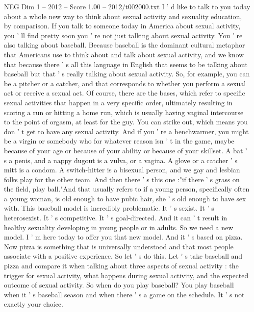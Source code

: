\begin{textsample}{NEG Dim 1 – 2012 – Score 1.00 – 2012/t002000.txt}  \label{ex:f1_neg_045}
I ' d like to talk to you today about a whole new way to think about sexual activity and sexuality education, by comparison.
If you talk to someone today in America about sexual activity, you ' ll find pretty soon you ' re not just talking about sexual activity.
You ' re also talking about baseball.
Because baseball is the dominant cultural metaphor that Americans use to think about and talk about sexual activity, and we know that because there ' s all this language in English that seems to be talking about baseball but that ' s really talking about sexual activity.
So, for example, you can be a pitcher or a catcher, and that corresponds to whether you perform a sexual act or receive a sexual act.
Of course, there are the bases, which refer to specific sexual activities that happen in a very specific order, ultimately resulting in scoring a run or hitting a home run, which is usually having vaginal intercourse to the point of orgasm, at least for the guy.
You can strike out, which means you don ' t get to have any sexual activity.
And if you ' re a benchwarmer, you might be a virgin or somebody who for whatever reason isn ' t in the game, maybe because of your age or because of your ability or because of your skillset.
A bat ' s a penis, and a nappy dugout is a vulva, or a vagina.
A glove or a catcher ' s mitt is a condom.
A switch-hitter is a bisexual person, and we gay and lesbian folks play for the other team.
And then there ' s this one :"if there ' s grass on the field, play ball."And that usually refers to if a young person, specifically often a young woman, is old enough to have pubic hair, she ' s old enough to have sex with.
This baseball model is incredibly problematic.
It ' s sexist.
It ' s heterosexist.
It ' s competitive.
It ' s goal-directed.
And it can ' t result in healthy sexuality developing in young people or in adults.
So we need a new model.
I ' m here today to offer you that new model.
And it ' s based on pizza.
Now pizza is something that is universally understood and that most people associate with a positive experience.
So let ' s do this.
Let ' s take baseball and pizza and compare it when talking about three aspects of sexual activity : the trigger for sexual activity, what happens during sexual activity, and the expected outcome of sexual activity.
So when do you play baseball?
You play baseball when it ' s baseball season and when there ' s a game on the schedule.
It ' s not exactly your choice.

\end{textsample}
